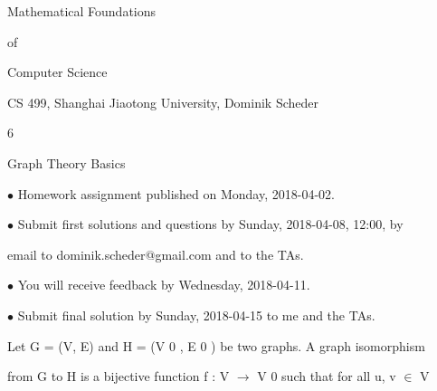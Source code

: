 \documentclass[a4paper,portrait,12pt]{article}
\begin{document}
\begin{flushleft}
Mathematical Foundations
\end{flushleft}


\begin{flushleft}
of
\end{flushleft}


\begin{flushleft}
Computer Science
\end{flushleft}


\begin{flushleft}
CS 499, Shanghai Jiaotong University, Dominik Scheder
\end{flushleft}





6





\begin{flushleft}
Graph Theory Basics
\end{flushleft}


\begin{flushleft}
$\bullet$ Homework assignment published on Monday, 2018-04-02.
\end{flushleft}


\begin{flushleft}
$\bullet$ Submit first solutions and questions by Sunday, 2018-04-08, 12:00, by
\end{flushleft}


\begin{flushleft}
email to dominik.scheder@gmail.com and to the TAs.
\end{flushleft}


\begin{flushleft}
$\bullet$ You will receive feedback by Wednesday, 2018-04-11.
\end{flushleft}


\begin{flushleft}
$\bullet$ Submit final solution by Sunday, 2018-04-15 to me and the TAs.
\end{flushleft}





\begin{flushleft}
Let G = (V, E) and H = (V 0 , E 0 ) be two graphs. A graph isomorphism
\end{flushleft}


\begin{flushleft}
from G to H is a bijective function f : V $\rightarrow$ V 0 such that for all u, v $\in$ V
\end{flushleft}
\end{document}
